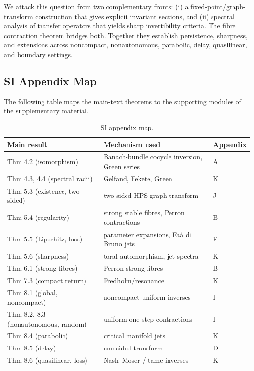\documentclass[11pt,a4paper]{article}
\theoremstyle{plain}
\theoremstyle{definition}
\theoremstyle{remark}
\numberwithin{equation}{section}
\numberwithin{figure}{section}
\begin{document}
We attack this question from two complementary fronts: (i) a fixed-point/graph-transform construction that gives explicit invariant sections, and (ii) spectral analysis of transfer operators that yields sharp invertibility criteria. The fibre contraction theorem bridges both. Together they establish persistence, sharpness, and extensions across noncompact, nonautonomous, parabolic, delay, quasilinear, and boundary settings.

\subsection*{SI Appendix Map}

The following table maps the main-text theorems to the supporting modules of the supplementary material.

\begin{table}[h]
\centering
\caption{SI appendix map.}
\label{tab:supp-map}
\begin{tabularx}{\textwidth}{X X l}
\toprule
\textbf{Main result} & \textbf{Mechanism used} & \textbf{Appendix} \\
\midrule
Thm 4.2 (isomorphism) & Banach-bundle cocycle inversion, Green series & A \\
Thm 4.3, 4.4 (spectral radii) & Gelfand, Fekete, Green & K \\
Thm 5.3 (existence, two-sided) & two-sided HPS graph transform & J \\
Thm 5.4 (regularity) & strong stable fibres, Perron contractions & B \\
Thm 5.5 (Lipschitz, loss) & parameter expansions, Faà di Bruno jets & F \\
Thm 5.6 (sharpness) & toral automorphism, jet spectra & K \\
Thm 6.1 (strong fibres) & Perron strong fibres & B \\
Thm 7.3 (compact return) & Fredholm/resonance & K \\
Thm 8.1 (global, noncompact) & noncompact uniform inverses & I \\
Thm 8.2, 8.3 (nonautonomous, random) & uniform one-step contractions & I \\
Thm 8.4 (parabolic) & critical manifold jets & K \\
Thm 8.5 (delay) & one-sided transform & D \\
Thm 8.6 (quasilinear, loss) & Nash–Moser / tame inverses & K \\
\bottomrule
\end{tabularx}
\end{table}
\end{document}
